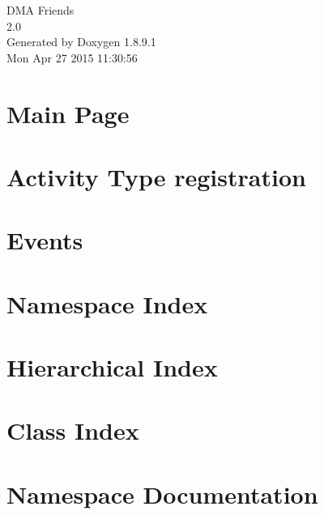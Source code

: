 \documentclass[twoside]{book}
\newcommand{\+}{\discretionary{\mbox{\scriptsize$\hookleftarrow$}}{}{}}
\newcommand{\clearemptydoublepage}{%
  \newpage{\pagestyle{empty}\cleardoublepage}%
}
\begin{document}
\hypersetup{pageanchor=false,
             bookmarks=true,
             bookmarksnumbered=true,
             pdfencoding=unicode
            }
\begin{titlepage}
\vspace*{7cm}
\begin{center}%
{\Large D\+M\+A Friends \\[1ex]\large 2.\+0 }\\
\vspace*{1cm}
{\large Generated by Doxygen 1.8.9.1}\\
\vspace*{0.5cm}
{\small Mon Apr 27 2015 11:30:56}\\
\end{center}
\end{titlepage}
\clearemptydoublepage
\tableofcontents
\clearemptydoublepage
{}
\hypersetup{pageanchor=true}

\chapter{Main Page}
\label{index}\hypertarget{index}{}
\chapter{Activity Type registration}
\label{df/d06/md_docs_ACTIVITY-TYPES}
\hypertarget{df/d06/md_docs_ACTIVITY-TYPES}{}

\chapter{Events}
\label{df/d0e/md_docs_EVENTS}
\hypertarget{df/d0e/md_docs_EVENTS}{}

\chapter{Namespace Index}

\chapter{Hierarchical Index}

\chapter{Class Index}

\chapter{Namespace Documentation}




\end{document}
